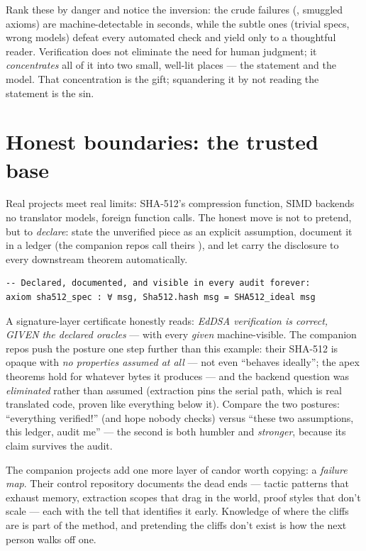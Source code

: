 \begin{pitfall}
Rank these by danger and notice the inversion: the crude failures
(, smuggled axioms) are machine-detectable in seconds, while
the subtle ones (trivial specs, wrong models) defeat every automated check
and yield only to a thoughtful reader. Verification does not eliminate the
need for human judgment; it \emph{concentrates} all of it into two small,
well-lit places --- the statement and the model. That concentration is the
gift; squandering it by not reading the statement is the sin.
\end{pitfall}

\section{Honest boundaries: the trusted base}

Real projects meet real limits: SHA-512's compression function, SIMD
backends no translator models, foreign function calls. The honest move is
not to pretend, but to \emph{declare}: state the unverified piece as an
explicit assumption, document it in a ledger (the companion repos call
theirs ), and let  carry the
disclosure to every downstream theorem automatically.

\begin{lstlisting}[language=Lean]
-- Declared, documented, and visible in every audit forever:
axiom sha512_spec : ∀ msg, Sha512.hash msg = SHA512_ideal msg
\end{lstlisting}

A signature-layer certificate honestly reads: \emph{EdDSA verification is
correct, GIVEN the declared oracles} --- with every \emph{given}
machine-visible. The companion repos push the posture one step further
than this example: their SHA-512 is opaque with \emph{no properties
assumed at all} --- not even ``behaves ideally''; the apex theorems hold
for whatever bytes it produces --- and the backend question was
\emph{eliminated} rather than assumed (extraction pins the serial path,
which is real translated code, proven like everything below it). Compare the two
postures: ``everything verified!'' (and hope nobody checks) versus ``these
two assumptions, this ledger, audit me'' --- the second is both humbler and
\emph{stronger}, because its claim survives the audit.

The companion projects add one more layer of candor worth copying: a
\emph{failure map}. Their control repository documents the dead ends ---
tactic patterns that exhaust memory, extraction scopes that drag in the
world, proof styles that don't scale --- each with the tell that identifies
it early. Knowledge of where the cliffs are is part of the method, and
pretending the cliffs don't exist is how the next person walks off one.

